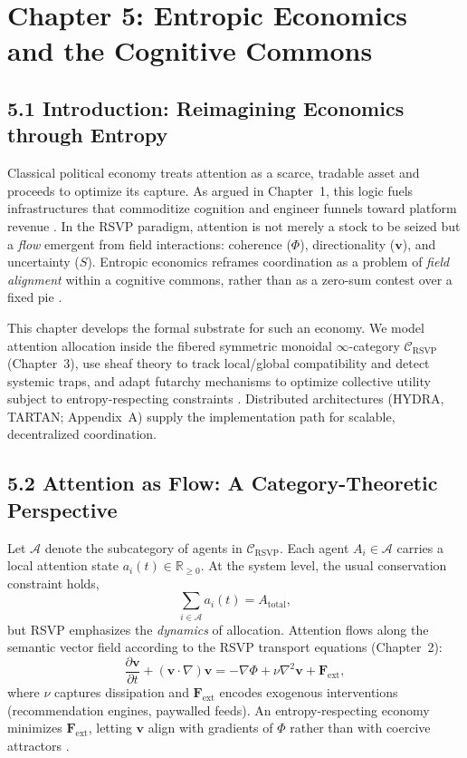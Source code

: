 \documentclass[12pt]{article}
\begin{document}
\section*{Chapter 5: Entropic Economics and the Cognitive Commons}

\subsection*{5.1 Introduction: Reimagining Economics through Entropy}

Classical political economy treats attention as a scarce, tradable asset and proceeds to
optimize its capture. As argued in Chapter~1, this logic fuels infrastructures that
commoditize cognition and engineer funnels toward platform revenue \citep{zuboff2019}.
In the RSVP paradigm, attention is not merely a stock to be seized but a \emph{flow}
emergent from field interactions: coherence (\(\Phi\)), directionality (\(\mathbf{v}\)), and
uncertainty (\(S\)). Entropic economics reframes coordination as a problem of
\emph{field alignment} within a cognitive commons, rather than as a zero-sum contest
over a fixed pie \citep{hanson2003, lanier2018}. 

This chapter develops the formal substrate for such an economy. We model attention
allocation inside the fibered symmetric monoidal \(\infty\)-category
\(\mathcal{C}_{\text{RSVP}}\) (Chapter~3), use sheaf theory to track local/global
compatibility and detect systemic traps, and adapt futarchy
mechanisms to optimize collective utility subject to entropy-respecting constraints
\citep{maclane1998, hatcher2002, hanson2003}. Distributed architectures (HYDRA,
TARTAN; Appendix~A) supply the implementation path for scalable, decentralized
coordination.

\subsection*{5.2 Attention as Flow: A Category-Theoretic Perspective}

Let \(\mathcal{A}\) denote the subcategory of agents in \(\mathcal{C}_{\text{RSVP}}\).
Each agent \(A_i \in \mathcal{A}\) carries a local attention state
\(a_i(t) \in \mathbb{R}_{\ge 0}\). At the system level, the usual conservation
constraint holds,
\[
\sum_{i \in \mathcal{A}} a_i(t) = A_{\mathrm{total}},
\]
but RSVP emphasizes the \emph{dynamics} of allocation. Attention flows along the
semantic vector field according to the RSVP transport equations (Chapter~2):
\[
\frac{\partial \mathbf{v}}{\partial t} + (\mathbf{v}\!\cdot\!\nabla)\mathbf{v}
= -\nabla \Phi + \nu \nabla^2 \mathbf{v} + \mathbf{F}_{\mathrm{ext}},
\]
where \(\nu\) captures dissipation and \(\mathbf{F}_{\mathrm{ext}}\) encodes
exogenous interventions (recommendation engines, paywalled feeds). An entropy-respecting
economy minimizes \(\mathbf{F}_{\mathrm{ext}}\), letting \(\mathbf{v}\) align with
gradients of \(\Phi\) rather than with coercive attractors \citep{shannon1948}. 
\end{document}
